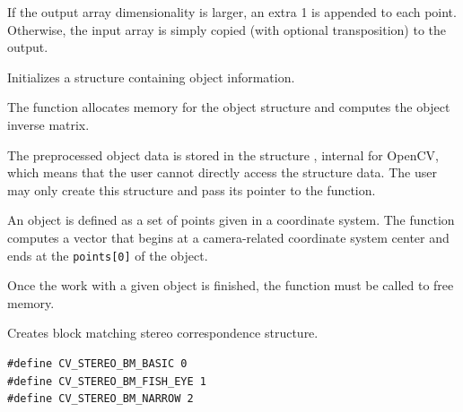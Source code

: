 If the output array dimensionality is larger, an extra 1 is appended to each point.  Otherwise, the input array is simply copied (with optional transposition) to the output.


\fi

\ifCPy

Initializes a structure containing object information.


\begin{description}
\end{description}

The function allocates memory for the object structure and computes the object inverse matrix.

The preprocessed object data is stored in the structure , internal for OpenCV, which means that the user cannot directly access the structure data. The user may only create this structure and pass its pointer to the function.

An object is defined as a set of points given in a coordinate system. The function  computes a vector that begins at a camera-related coordinate system center and ends at the \texttt{points[0]} of the object.

Once the work with a given object is finished, the function  must be called to free memory.

Creates block matching stereo correspondence structure.

\begin{lstlisting}
#define CV_STEREO_BM_BASIC 0
#define CV_STEREO_BM_FISH_EYE 1
#define CV_STEREO_BM_NARROW 2
\end{lstlisting}


